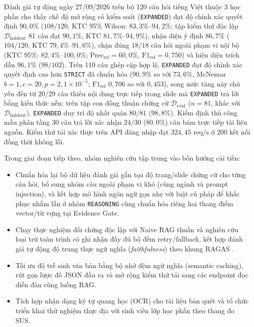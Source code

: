 \documentclass{IEEEtran}
\begin{document}
Đánh giá tự động ngày 27/09/2026 trên bộ 120 câu hỏi tiếng Việt thuộc 3 học phần cho thấy chế độ mở rộng có kiểm soát (\texttt{EXPANDED}) đạt độ chính xác quyết định $90{,}0\%$ ($108/120$, KTC 95\% Wilson: $83{,}3\%\text{--}94{,}2\%$; tập kiểm thử độc lập $\mathcal{D}_{\text{holdout}}$ 81 câu đạt $90{,}1\%$, KTC $81{,}7\%\text{--}94{,}9\%$), nhận diện ý định $86{,}7\%$ ($104/120$, KTC $79{,}4\%\text{--}91{,}6\%$), chặn đúng $18/18$ câu hỏi ngoài phạm vi nội bộ (KTC 95\%: $82{,}4\%\text{--}100{,}0\%$; $\text{Prec}_{\text{ref}} = 60{,}0\%$, $\text{F1}_{\text{ref}} = 0{,}750$) và hiện diện trích dẫn $96{,}1\%$ ($98/102$). Trên 110 câu ghép cặp hợp lệ, \texttt{EXPANDED} đạt độ chính xác quyết định cao hơn \texttt{STRICT} đã chuẩn hóa ($90{,}9\%$ so với $73{,}6\%$, McNemar $b=1, c=20, p = 2{,}1\times 10^{-5}$; $\text{F1}_{\text{ref}}$ $0{,}706$ so với $0{,}453$), song mức tăng này chủ yếu đến từ 20/29 câu thiếu nội dung trực tiếp trong slide mà \texttt{EXPANDED} trả lời bằng kiến thức nền; trên tập con đồng thuận chứng cứ $\mathcal{D}_{\text{evid}}$ ($n=81$, khác với $\mathcal{D}_{\text{holdout}}$), \texttt{EXPANDED} duy trì độ nhất quán $80/81$ ($98{,}8\%$). Kiểm định thủ công mẫu phân tầng 30 câu trả lời xác nhận $24/30$ ($80{,}0\%$) câu bám trực tiếp tài liệu nguồn. Kiểm thử tải xác thực trên API đăng nhập đạt $324{,}45\text{~req/s}$ ở 200 kết nối đồng thời không lỗi.

Trong giai đoạn tiếp theo, nhóm nghiên cứu tập trung vào bốn hướng cải tiến:
\begin{itemize}
    \item Chuẩn hóa lại bộ dữ liệu đánh giá gắn tọa độ trang/slide chứng cứ cho từng câu hỏi, bổ sung nhóm câu ngoài phạm vi khó (cùng ngành và prompt injection), và kết hợp mô hình ngôn ngữ gọn nhẹ với luật cú pháp để khắc phục nhầm lẫn ở nhóm \texttt{REASONING} cùng chuẩn hóa riêng hai thang điểm vector/từ vựng tại Evidence Gate.
    \item Chạy thực nghiệm đối chứng độc lập với Naive RAG thuần và nghiên cứu loại trừ toàn trình có ghi nhận đầy đủ bộ đếm retry/fallback, kết hợp đánh giá tự động độ trung thực ngữ nghĩa (\textit{faithfulness}) theo khung RAGAS \cite{es2024ragas}.
    \item Tối ưu độ trễ sinh văn bản bằng bộ nhớ đệm ngữ nghĩa (semantic caching), rút gọn lược đồ JSON đầu ra và mở rộng kiểm thử tải sang các endpoint đọc diễn đàn cùng luồng RAG.
    \item Tích hợp nhận dạng ký tự quang học (OCR) cho tài liệu bản quét và tổ chức triển khai thử nghiệm thực địa với sinh viên lớp học phần theo thang đo SUS.
\end{itemize}
\end{document}
